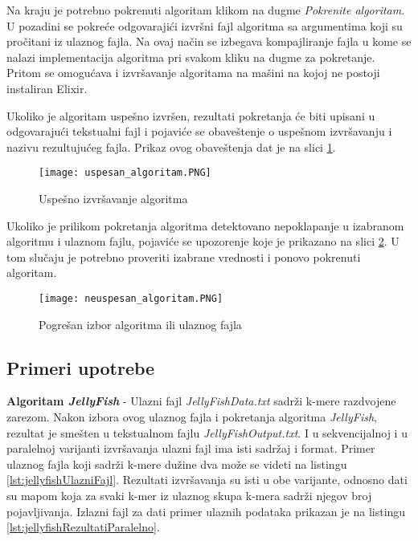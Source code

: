 \documentclass[12pt,oneside]{memoir}
\begin{document}
Na kraju je potrebno pokrenuti algoritam klikom na dugme \textit{Pokrenite algoritam}. U pozadini se pokreće odgovarajići izvršni fajl algoritma sa argumentima koji su pročitani iz ulaznog fajla. Na ovaj način se izbegava kompajliranje fajla u kome se nalazi implementacija algoritma pri svakom kliku na dugme za pokretanje. Pritom se omogućava i izvršavanje algoritama na mašini na kojoj ne postoji instaliran Elixir.

Ukoliko je algoritam uspešno izvršen, rezultati pokretanja će biti upisani u odgovarajući tekstualni fajl i pojaviće se obaveštenje o uspešnom izvršavanju i nazivu rezultujućeg fajla. Prikaz ovog obaveštenja dat je na slici \ref{fig:uspesnoIzvrsavanje}.

\begin{figure}[h]
\centering
\texttt{[image: uspesan\_algoritam.PNG]}
\caption{Uspešno izvršavanje algoritma}
\label{fig:uspesnoIzvrsavanje}
\end{figure}

Ukoliko je prilikom pokretanja algoritma detektovano nepoklapanje u izabranom algoritmu i ulaznom fajlu, pojaviće se upozorenje koje je prikazano na slici \ref{fig:neuspesnoIzvrsavanje}. U tom slučaju je potrebno proveriti izabrane vrednosti i ponovo pokrenuti algoritam.

\begin{figure}[h]
\centering
\texttt{[image: neuspesan\_algoritam.PNG]}
\caption{Pogrešan izbor algoritma ili ulaznog fajla}
\label{fig:neuspesnoIzvrsavanje}
\end{figure}

\subsection{Primeri upotrebe}

\textbf{Algoritam \textit{JellyFish}} - Ulazni fajl \textit{JellyFishData.txt} sadrži k-mere razdvojene zarezom. Nakon izbora ovog ulaznog fajla i pokretanja algoritma \textit{JellyFish}, rezultat je smešten u tekstualnom fajlu \textit{JellyFishOutput.txt}. I u sekvencijalnoj i u paralelnoj varijanti izvršavanja ulazni fajl ima isti sadržaj i format. Primer ulaznog fajla koji sadrži k-mere dužine dva može se videti na listingu \ref{lst:jellyfishUlazniFajl}. Rezultati izvršavanja su isti u obe varijante, odnosno dati su mapom koja za svaki k-mer iz ulaznog skupa k-mera sadrži njegov broj pojavljivanja. Izlazni fajl za dati primer ulaznih podataka prikazan je na listingu \ref{lst:jellyfishRezultatiParalelno}.
\end{document}
